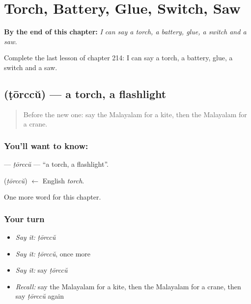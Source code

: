 
\chapter{Torch, Battery, Glue, Switch, Saw}
\label{ch:ml-torch-battery-glue-switch-saw}

\begin{chapteropening}
\textbf{By the end of this chapter:} \emph{I can say a torch, a battery, glue, a switch and a saw.}

Complete the last lesson of chapter 214: I can say a torch, a battery, glue, a switch and a saw.
\end{chapteropening}

\section[\texorpdfstring{\ml{ടോർച്ച്} (ṭōrccŭ)}{ടോർച്ച് (ṭōrccŭ)}]{ (ṭōrccŭ) — a torch, a flashlight}

\label{lesson:ML-C214-torccu}



\begin{quote}
Before the new one: say the Malayalam for a kite, then the Malayalam for a crane.
\end{quote}

\subsection*{You'll want to know: }
\textbf{} — \emph{ṭōrccŭ} — \textquotedblleft{}a torch, a flashlight\textquotedblright{}.

\begin{cousinweb}
\textbf{} (\emph{ṭōrccŭ}) $\leftarrow$ English \emph{torch}.
\end{cousinweb}

\begin{grammarlens}[title={What you've built}]
One more word for this chapter.
\end{grammarlens}

\subsection*{Your turn}
\begin{itemize}
\raggedright
  \item \emph{Say it:} \emph{ṭōrccŭ}
  \item \emph{Say it:} \emph{ṭōrccŭ}, once more
  \item \emph{Say it:} say \emph{ṭōrccŭ}
  \item \emph{Recall:} say the Malayalam for a kite, then the Malayalam for a crane, then say \emph{ṭōrccŭ} again
\end{itemize}

